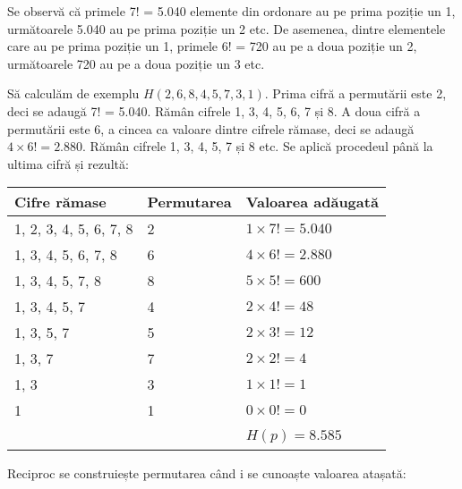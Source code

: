 Se observă că primele 7! = 5.040 elemente din ordonare au pe prima poziție un
1, următoarele 5.040 au pe prima poziție un 2 etc. De asemenea, dintre
elementele care au pe prima poziție un 1, primele 6! = 720 au pe a doua
poziție un 2, următoarele 720 au pe a doua poziție un 3 etc.

Să calculăm de exemplu $H(2, 6, 8, 4, 5, 7, 3, 1)$. Prima cifră a permutării
este 2, deci se adaugă 7! = 5.040. Rămân cifrele 1, 3, 4, 5, 6, 7 și 8. A doua
cifră a permutării este 6, a cincea ca valoare dintre cifrele rămase, deci se
adaugă $4 \times 6! = 2.880$. Rămân cifrele 1, 3, 4, 5, 7 și 8 etc. Se aplică
procedeul până la ultima cifră și rezultă:

\begin{table}[H]
  \centering
  \begin{tabular}{|l|l|l|}
    \hline
    Cifre rămase           & Permutarea & Valoarea adăugată \\ \hline
    1, 2, 3, 4, 5, 6, 7, 8 & 2          & $1 \times 7! = 5.040$ \\
    1, 3, 4, 5, 6, 7, 8    & 6          & $4 \times 6! = 2.880$ \\
    1, 3, 4, 5, 7, 8       & 8          & $5 \times 5! = 600$ \\
    1, 3, 4, 5, 7          & 4          & $2 \times 4! = 48$ \\
    1, 3, 5, 7             & 5          & $2 \times 3! = 12$ \\
    1, 3, 7                & 7          & $2 \times 2! = 4$ \\
    1, 3                   & 3          & $1 \times 1! = 1$ \\
    1                      & 1          & $0 \times 0! = 0$ \\ \hline
    \                      &            & $H(p) = 8.585 $\\ \hline
  \end{tabular}
\end{table}

Reciproc se construiește permutarea când i se cunoaște valoarea atașată:

